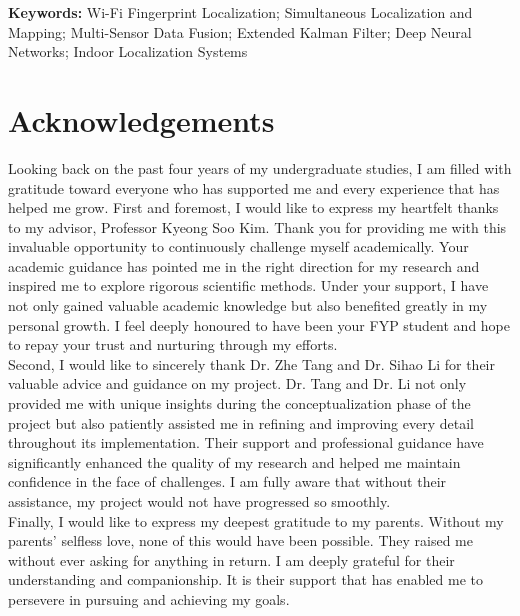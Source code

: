 \documentclass[12pt,a4paper]{article}
\numberwithin{equation}{section}
\begin{document}
\noindent\textbf{Keywords:} 
\noindent Wi-Fi Fingerprint Localization; Simultaneous Localization and Mapping; Multi-Sensor Data Fusion; Extended Kalman Filter; Deep Neural Networks; Indoor Localization Systems






\newpage
\section*{Acknowledgements}
Looking back on the past four years of my undergraduate studies, I am filled with gratitude toward everyone who has supported me and every experience that has helped me grow. First and foremost, I would like to express my heartfelt thanks to my advisor, Professor Kyeong Soo Kim. Thank you for providing me with this invaluable opportunity to continuously challenge myself academically. Your academic guidance has pointed me in the right direction for my research and inspired me to explore rigorous scientific methods. Under your support, I have not only gained valuable academic knowledge but also benefited greatly in my personal growth. I feel deeply honoured to have been your FYP student and hope to repay your trust and nurturing through my efforts.\\
Second, I would like to sincerely thank Dr. Zhe Tang and Dr. Sihao Li for their valuable advice and guidance on my project. Dr. Tang and Dr. Li not only provided me with unique insights during the conceptualization phase of the project but also patiently assisted me in refining and improving every detail throughout its implementation. Their support and professional guidance have significantly enhanced the quality of my research and helped me maintain confidence in the face of challenges. I am fully aware that without their assistance, my project would not have progressed so smoothly.\\
Finally, I would like to express my deepest gratitude to my parents. Without my parents' selfless love, none of this would have been possible. They raised me without ever asking for anything in return. I am deeply grateful for their understanding and companionship. It is their support that has enabled me to persevere in pursuing and achieving my goals.
\newpage


\tableofcontents
\newpage



\listoftables
\newpage
\end{document}
